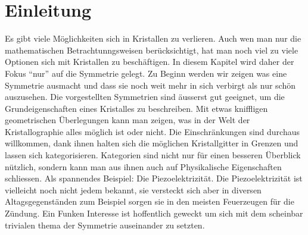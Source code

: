\section{Einleitung}
Es gibt viele Möglichkeiten sich in Kristallen zu verlieren.
Auch wen man nur die mathematischen Betrachtunngsweisen berücksichtigt, 
hat man noch viel zu viele Optionen sich mit Kristallen zu beschäftigen.
In diesem Kapitel wird daher der Fokus ``nur'' auf die Symmetrie gelegt.
Zu Beginn werden wir zeigen was eine Symmetrie ausmacht und 
dass sie noch weit mehr in sich verbirgt als nur schön auszusehen.
Die vorgestellten Symmetrien sind äusserst gut geeignet, 
um die Grundeigenschaften eines Kristalles zu beschreiben.
Mit etwas kniffligen geometrischen Überlegungen kann man zeigen, 
was in der Welt der Kristallographie alles möglich ist oder nicht.
Die Einschränkungen sind durchaus willkommen, 
dank ihnen halten sich die möglichen Kristallgitter in Grenzen 
und lassen sich kategorisieren.%
Kategorien sind nicht nur für einen besseren Überblick nützlich, 
sondern kann man aus ihnen auch auf Physikalische Eigenschaften schliessen. 
Als spannendes Beispiel: Die Piezoelektrizität.
Die Piezoelektrizität ist vielleicht noch nicht jedem bekannt, 
sie versteckt sich aber in diversen Altagsgegenständen 
zum Beispiel sorgen sie in den meisten Feuerzeugen für die Zündung.
Ein Funken Interesse ist hoffentlich geweckt 
um sich mit dem scheinbar trivialen thema der Symmetrie auseinander zu setzten.



